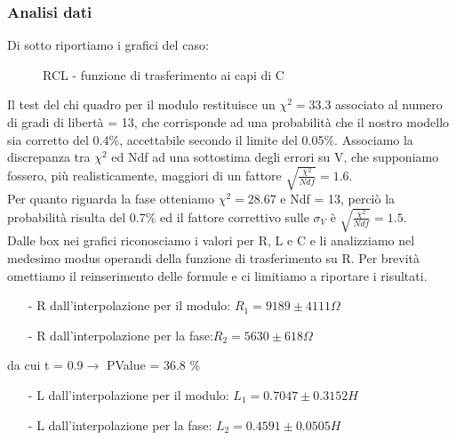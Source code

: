 \documentclass{article}
\theoremstyle{definition}
\begin{document}
\subsubsection*{Analisi dati}
Di sotto riportiamo i grafici del caso:


\begin{figure}[!h]
\caption{RCL - funzione di trasferimento ai capi di C}


\label{fig:RLC_su_C}
\end{figure}

\noindent Il test del chi quadro per il modulo restituisce un \(\chi^{2} = 33.3\) associato al numero di gradi di libertà = 13, che corrisponde ad una probabilità che il nostro modello sia corretto del 0.4\%, accettabile secondo il limite del 0.05\%. Associamo la discrepanza tra \(\chi^{2}\) ed Ndf ad una sottostima degli errori su V, che supponiamo fossero, più realisticamente, maggiori di un fattore \(\sqrt{\frac{\chi^{2}}{Ndf}} = 1.6\). \\
Per quanto riguarda la fase otteniamo \(\chi^{2} = 28.67\) e Ndf = 13, perciò la probabilità risulta del 0.7\% ed il fattore correttivo sulle \(\sigma_{V}\) è  \(\sqrt{\frac{\chi^{2}}{Ndf}} = 1.5\). \\

\noindent Dalle box nei grafici riconosciamo i valori per R, L e C e li analizziamo nel medesimo modus operandi della funzione di trasferimento su R. Per brevità omettiamo il reinserimento delle formule e ci limitiamo a riportare i risultati. \\

\begin{enumerate}
    \item[-] R dall'interpolazione per il modulo: \(R_{1} = 9189 \pm 4111 \Omega\) 
    \item[-]  R dall'interpolazione per la fase:\(R_{2} = 5630 \pm 618 \Omega\)
\end{enumerate} 

da cui t = 0.9\(\rightarrow\) PValue = 36.8 \% \\

\begin{enumerate}
    \item[-] L dall'interpolazione per il modulo: \(L_{1} = 0.7047 \pm 0.3152 H\) 
    \item[-] L dall'interpolazione per la fase: \(L_{2} = 0.4591 \pm 0.0505 H\)
\end{enumerate}
 
\end{document}
